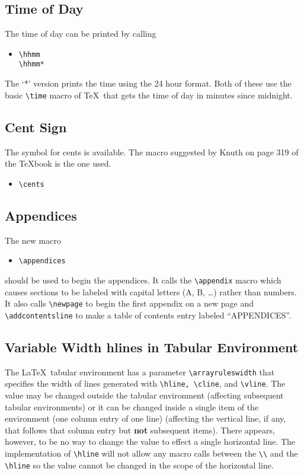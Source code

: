 \subsection{Time of Day}
The time of day can be printed by calling 
\begin{itemize}
\item[]
\verb|\hhmm|\\
\verb|\hhmm*|
\end{itemize}
The `*' version prints the time using the 24 hour
format.  Both of
these use the basic \verb|\time| macro of \TeX\ that gets the time of
day in minutes since midnight.
\subsection{Cent Sign}
The symbol for cents is available.  The macro suggested by Knuth on
page 319 of the TeXbook is the one used.
\begin{itemize}
\item[]
\verb|\cents|
\end{itemize}
\subsection{Appendices}\label{sec:appendicies}
The new macro 
\begin{itemize}
\item[]
\verb|\appendices|
\end{itemize}
should be used to begin the appendices.  It calls the
\verb|\appendix| macro which causes sections to be labeled with
capital letters (A, B, \dots) rather than numbers.  It also calls
\verb|\newpage| to begin the first appendix on a new page and
\verb|\addcontentsline| to make a table of contents entry labeled
``APPENDICES''.  
\subsection{Variable Width hlines in Tabular Environment}
The \LaTeX\ tabular environment has a parameter
\verb|\arrayruleswidth| that specifies the width of lines generated
with \verb|\hline, \cline|, and \verb|\vline|.  The value may be
changed outside the tabular environment (affecting subsequent
tabular environments) or it can be changed inside a single item of the
environment (one column entry of one line) (affecting the vertical
line, if any, that follows that column entry but {\bf not} subsequent
items).  There appears, however, to be no way to change the value to
effect a single horizontal line.  The implementation of \verb|\hline|
will not allow any macro calls between the \verb|\\| and the
\verb|\hline| so the value cannot be changed in the scope of the
horizontal line.

